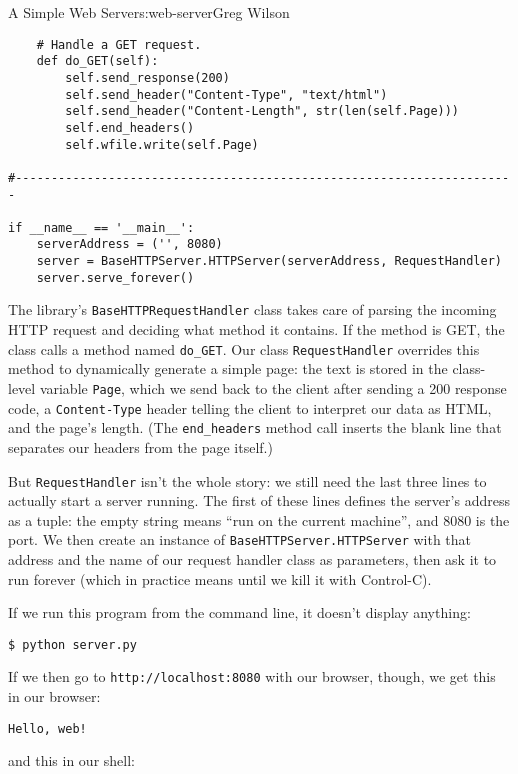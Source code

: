 \begin{aosachapter}{A Simple Web Server}{s:web-server}{Greg Wilson}
\begin{verbatim}
    # Handle a GET request.
    def do_GET(self):
        self.send_response(200)
        self.send_header("Content-Type", "text/html")
        self.send_header("Content-Length", str(len(self.Page)))
        self.end_headers()
        self.wfile.write(self.Page)

#----------------------------------------------------------------------

if __name__ == '__main__':
    serverAddress = ('', 8080)
    server = BaseHTTPServer.HTTPServer(serverAddress, RequestHandler)
    server.serve_forever()
\end{verbatim}

The library's \texttt{BaseHTTPRequestHandler} class takes care of
parsing the incoming HTTP request and deciding what method it contains.
If the method is GET, the class calls a method named \texttt{do\_GET}.
Our class \texttt{RequestHandler} overrides this method to dynamically
generate a simple page: the text is stored in the class-level variable
\texttt{Page}, which we send back to the client after sending a 200
response code, a \texttt{Content-Type} header telling the client to
interpret our data as HTML, and the page's length. (The
\texttt{end\_headers} method call inserts the blank line that separates
our headers from the page itself.)

But \texttt{RequestHandler} isn't the whole story: we still need the
last three lines to actually start a server running. The first of these
lines defines the server's address as a tuple: the empty string means
``run on the current machine'', and 8080 is the port. We then create an
instance of \newline \texttt{BaseHTTPServer.HTTPServer} with that
address and the name of our request handler class as parameters, then
ask it to run forever (which in practice means until we kill it with
Control-C).

If we run this program from the command line, it doesn't display
anything:

\begin{verbatim}
$ python server.py
\end{verbatim}

If we then go to \texttt{http://localhost:8080} with our browser,
though, we get this in our browser:

\begin{verbatim}
Hello, web!
\end{verbatim}

and this in our shell:


\end{aosachapter}
